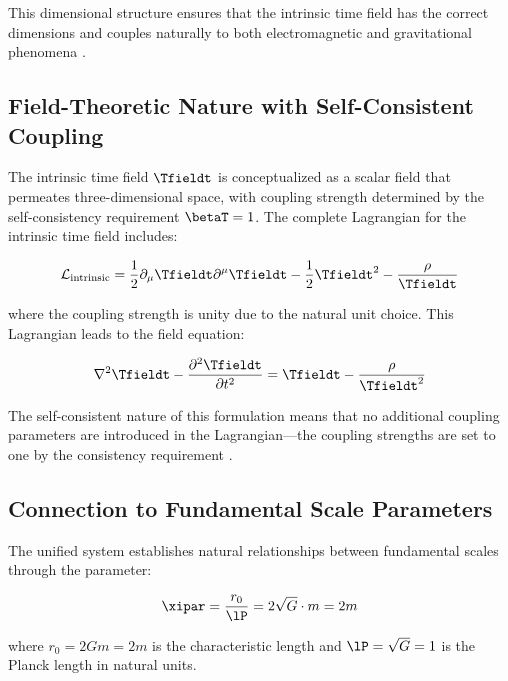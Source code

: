 	This dimensional structure ensures that the intrinsic time field has the correct dimensions and couples naturally to both electromagnetic and gravitational phenomena \cite{pascher_lagrangian_2025}.
	
	\subsection{Field-Theoretic Nature with Self-Consistent Coupling}
	\label{subsec:field_theoretic_self_consistent}
	
	The intrinsic time field $\Tfieldt$ is conceptualized as a scalar field that permeates three-dimensional space, with coupling strength determined by the self-consistency requirement $\betaT = 1$. The complete Lagrangian for the intrinsic time field includes:
	
	\begin{equation}
		\mathcal{L}_{\text{intrinsic}} = \frac{1}{2} \partial_\mu \Tfieldt \partial^\mu \Tfieldt - \frac{1}{2}\Tfieldt^2 - \frac{\rho}{\Tfieldt}
	\end{equation}
	
	where the coupling strength is unity due to the natural unit choice. This Lagrangian leads to the field equation:
	
	\begin{equation}
		\nabla^2 \Tfieldt - \frac{\partial^2 \Tfieldt}{\partial t^2} = \Tfieldt - \frac{\rho}{\Tfieldt^2}
	\end{equation}
	
	The self-consistent nature of this formulation means that no additional coupling parameters are introduced in the Lagrangian—the coupling strengths are set to one by the consistency requirement \cite{pascher_unified_2025}.
	
	\subsection{Connection to Fundamental Scale Parameters}
	\label{subsec:fundamental_scales}
	
	The unified system establishes natural relationships between fundamental scales through the parameter:
	
	\begin{equation}
		\xipar = \frac{r_0}{\lP} = 2\sqrt{G} \cdot m = 2m
	\end{equation}
	
	where $r_0 = 2Gm = 2m$ is the characteristic length and $\lP = \sqrt{G} = 1$ is the Planck length in natural units.
	
